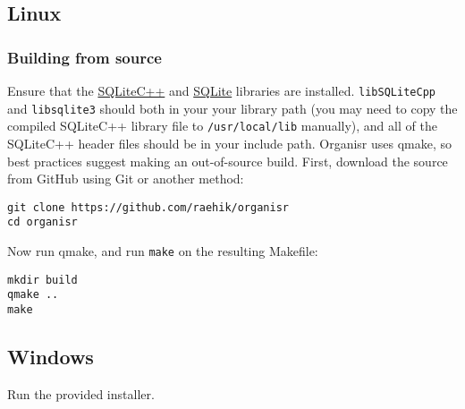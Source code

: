 \subsection{Linux}

\subsubsection{Building from source}

Ensure that the \href{http://srombauts.github.io/SQLiteCpp/}{SQLiteC++} and
\href{http://sqlite.org/download.html}{SQLite} libraries are installed.
\verb|libSQLiteCpp| and \verb|libsqlite3| should both in your your library path
(you may need to copy the compiled SQLiteC++ library file to
\verb|/usr/local/lib| manually), and all of the SQLiteC++ header files should be
in your include path. Organisr uses qmake, so best practices suggest making an
out-of-source build. First, download the source from GitHub using Git or another
method:

\begin{lstlisting}
git clone https://github.com/raehik/organisr
cd organisr
\end{lstlisting}

Now run qmake, and run \verb|make| on the resulting Makefile:

\begin{lstlisting}
mkdir build
qmake ..
make
\end{lstlisting}


\subsection{Windows}

Run the provided installer.
